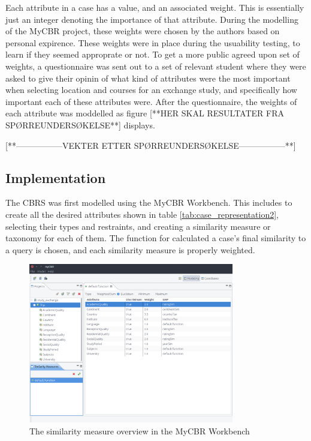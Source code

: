 Each attribute in a case has a value, and an associated weight. This is essentially just an integer denoting the importance of that attribute. During the modelling of the MyCBR project, these weights were chosen by the authors based on personal expirence. These weights were in place during the usuability testing, to learn if they seemed approprate or not. To get a more public agreed upon set of weights, a questionnaire was sent out to a set of relevant student where they were asked to give their opinin of what kind of attributes were the most important when selecting location and courses for an exchange study, and specifically how important each of these attributes were. After the questionnaire, the weights of each attribute was moddelled as figure [**HER SKAL RESULTATER FRA SPØRREUNDERSØKELSE**] displays.

[**-----------------VEKTER ETTER SPØRREUNDERSØKELSE-----------------**]

\subsection{Implementation}

The CBRS was first modelled using the MyCBR Workbench. This includes to create all the desired attributes shown in table \ref{tab:case_representation2}, selecting their types and restraints, and creating a similarity measure or taxonomy for each of them. The function for calculated a case's final similarity to a query is chosen, and each similarity measure is properly weighted.

\begin{figure}[H]
    \label{fig:workbench_exmaple}
    \centering
    \includegraphics[width=0.8\textwidth]{fig/cbr_model.png}
    \caption{The similarity measure overview in the MyCBR Workbench}
\end{figure}

